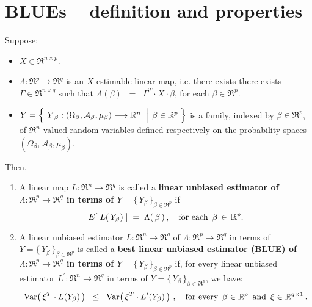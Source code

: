 

\section{BLUEs -- definition and properties}
\setcounter{theorem}{0}
\setcounter{equation}{0}

\renewcommand{\theenumi}{\roman{enumi}}
\renewcommand{\labelenumi}{\textnormal{(\theenumi)}$\;\;$}


\begin{definition}
\mbox{}\vskip 0.1cm\noindent
Suppose:
\begin{itemize}
\item
	$X \in \Re^{n \times p}$.
\item
	$\Lambda : \Re^{p} \longrightarrow \Re^{q}$ is an $X$-estimable linear map,
	i.e. there exists there exists $\Gamma \in \Re^{n \times q}$ such that
	$\Lambda(\beta) \;\; =\;\; \Gamma^{T} \cdot X \cdot \beta$,
	for each $\beta \in \Re^{p}$.
\item
	$Y = \left\{\;
		\left.
		\overset{{\color{white}.}}{Y}_{\beta} : (\Omega_{\beta},\mathcal{A}_{\beta},\mu_{\beta}) \longrightarrow \Re^{n}
		\;\;\right\vert\;
		\beta \in \Re^{p}
		\;\right\}$
	is a family, indexed by $\beta \in \Re^{p}$,
	of $\Re^{n}$-valued random variables defined respectively on the
	probability spaces $(\Omega_{\beta},\mathcal{A}_{\beta},\mu_{\beta})$.
\end{itemize}
Then,
\begin{enumerate}
\item
	A linear map $L : \Re^{n} \longrightarrow \Re^{q}$ is called a
	{\color{red}\textbf{linear unbiased estimator of
	$\Lambda : \Re^{p} \longrightarrow \Re^{q}$
	in terms of $Y = \{\,Y_{\beta}\,\}_{\beta\in\Re^{p}}$}} if
	\begin{equation*}
	E\!\left[\;L(\,Y_{\beta})\;\right] \;=\; \Lambda(\,\beta\,)\,,
	\quad
	\textnormal{for each \,$\beta \,\in\, \Re^{p}$}.
	\end{equation*}
\item
	A linear unbiased estimator $L : \Re^{n} \longrightarrow \Re^{q}$
	of $\Lambda : \Re^{p} \longrightarrow \Re^{q}$
	in terms of $Y = \{\,Y_{\beta}\,\}_{\beta\in\Re^{p}}$
	is called a
	{\color{red}\textbf{best linear unbiased estimator (BLUE) of
	$\Lambda : \Re^{p} \longrightarrow \Re^{q}$ in terms of $Y = \{\,Y_{\beta}\,\}_{\beta\in\Re^{p}}$}}
	if, for every linear unbiased estimator $L^{\prime} : \Re^{n} \longrightarrow \Re^{q}$
	in terms of $Y = \{\,Y_{\beta}\,\}_{\beta\in\Re^{p}}$, we have:
	\begin{equation*}
	\Var\!\left(\,\xi^{T} \cdot L(Y_{\beta})\,\right)
	\;\; \leq \;\;
		\Var\!\left(\,\xi^{T} \cdot L^{\prime}(Y_{\beta})\,\right)\,,
	\quad
	\textnormal{for every \,$\beta \in \Re^{p}$\, and \,$\xi \in \Re^{q \times 1}$}\,.
	\end{equation*}
\end{enumerate}
\end{definition}

